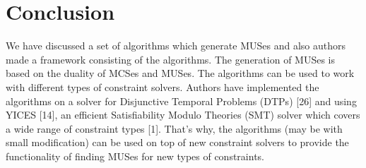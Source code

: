 \section{Conclusion}
\label{sec:conclusion}
We have discussed a set of algorithms which generate MUSes and also authors made a framework consisting of the algorithms. The generation of MUSes is based on the duality of MCSes and MUSes. The algorithms can be used to work with different types of constraint solvers. Authors have implemented the algorithms on a solver for Disjunctive Temporal Problems (DTPs) [26] and using YICES [14], an efficient Satisfiability Modulo Theories (SMT) solver which covers a wide range of constraint types [1]. That's why, the algorithms (may be with small modification) can be used on top of new constraint solvers to provide the functionality of finding MUSes for new types of constraints.
